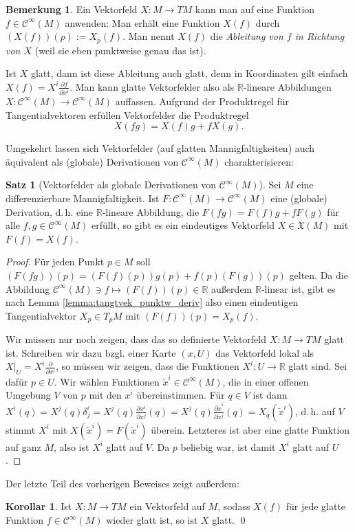 \documentclass[a4paper]{scrreprt}
\numberwithin{equation}{chapter}
\newcommand{\R}{\mathbb{R}}
\newcommand{\sC}{\mathcal{C}^{\infty}}
\theoremstyle{definition}
\newtheorem{satz}[defn]{Satz}
\newtheorem{kor}[defn]{Korollar}
\newtheorem{bem}[defn]{Bemerkung}
\begin{document}
\begin{bem}
	Ein Vektorfeld $X\colon M \to TM$ kann man auf eine Funktion $f\in\sC(M)$ anwenden: Man erhält eine Funktion $X(f)$ durch $(X(f))(p) := X_p(f)$. Man nennt $X(f)$ die \emph{Ableitung von $f$ in Richtung von $X$} (weil sie eben punktweise genau das ist).

	Ist $X$ glatt, dann ist diese Ableitung auch glatt, denn in Koordinaten gilt einfach $X(f) = X^i \frac{\partial f}{\partial x^i}$. Man kann glatte Vektorfelder also als $\R$-lineare Abbildungen $X\colon \sC(M) \to \sC(M)$ auffassen. Aufgrund der Produktregel für Tangentialvektoren erfüllen Vektorfelder die Produktregel
	\[X(fg) = X(f) g + f X(g).\]
\end{bem}
Umgekehrt lassen sich Vektorfelder (auf glatten Mannigfaltigkeiten) auch äquivalent als (globale) Derivationen von $\sC(M)$ charakterisieren:
\begin{satz}[Vektorfelder als globale Derivationen von $\sC(M)$]\label{satz:Vektorfelder_globale_Deriv}
	Sei $M$ eine differenzierbare Mannigfaltigkeit. Ist $F\colon \sC(M) \to \sC(M)$ eine (globale) Derivation, d.\,h. eine $\R$-lineare Abbildung, die $F(fg) = F(f) g + f F(g)$ für alle $f,g \in \sC(M)$ erfüllt, so gibt es ein eindeutiges Vektorfeld $X \in \mathfrak X(M)$ mit $F(f) = X(f)$.

	\begin{proof}
		Für jeden Punkt $p \in M$ soll $(F(fg))(p) = (F(f)(p)) g(p) + f(p) (F(g))(p)$ gelten. Da die Abbildung $\sC(M) \ni f \mapsto (F(f))(p) \in \mathbb R$ außerdem $\R$-linear ist, gibt es nach Lemma \ref{lemma:tangtvek_punktw_deriv} also einen eindeutigen Tangentialvektor $X_p \in T_pM$ mit $(F(f))(p) = X_p(f)$.

		Wir müssen nur noch zeigen, dass das so definierte Vektorfeld $X\colon M \to TM$ glatt ist. Schreiben wir dazu bzgl. einer Karte $(x,U)$ das Vektorfeld lokal als $X|_U = X^i \frac{\partial}{\partial x^i}$, so müssen wir zeigen, dass die Funktionen $X^i \colon U \to \mathbb R$ glatt sind. Sei dafür $p \in U$. Wir wählen Funktionen $\tilde x^i \in \sC(M)$, die in einer offenen Umgebung $V$ von $p$ mit den $x^i$ übereinstimmen. Für $q \in V$ ist dann $X^i(q) = X^j(q) \delta^i_j = X^j(q) \frac{\partial x^i}{\partial x^j}(q) = X^j(q) \frac{\partial \tilde x^i}{\partial x^j}(q) = X_q (\tilde x^i)$, d.\,h. auf $V$ stimmt $X^i$ mit $X(\tilde x^i) = F(\tilde x^i)$ überein. Letzteres ist aber eine glatte Funktion auf ganz $M$, also ist $X^i$ glatt auf $V$. Da $p$ beliebig war, ist damit $X^i$ glatt auf $U$.
	\end{proof}
\end{satz}
Der letzte Teil des vorherigen Beweises zeigt außerdem:
\begin{kor}
	Ist $X\colon M \to TM$ ein Vektorfeld auf $M$, sodass $X(f)$ für jede glatte Funktion $f \in \sC(M)$ wieder glatt ist, so ist $X$ glatt. \qed
\end{kor}
\end{document}
